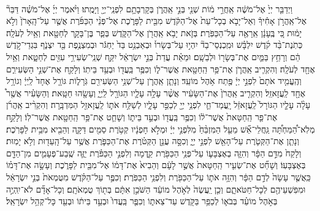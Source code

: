 \documentclass[twoside, openany, parskip=half, 11pt]{book}
\begin{document}
\begin{footnotesize}
\begin{multicols}{2}
\\
 וַיְדַבֵּ֤ר יְיָ֙ אֶל־מֹשֶׁ֔ה אַֽחֲרֵ֣י מ֔וֹת שְׁנֵ֖י בְּנֵ֣י אַֽהֲרֹ֑ן בְּקָרְבָתָ֥ם לִפְנֵֽי־יְיָ֖ וַיָּמֻֽתוּ׃ וַיֹּ֨אמֶר יְיָ֜ אֶל־מֹשֶׁ֗ה דַּבֵּר֘ אֶל־אַֽהֲרֹ֣ן אָחִ֒יךָ֒ וְאַל־יָבֹ֤א בְכָל־עֵת֙ אֶל־הַקֹּ֔דֶשׁ מִבֵּ֖ית לַפָּרֹ֑כֶת אֶל־פְּנֵ֨י הַכַּפֹּ֜רֶת אֲשֶׁ֤ר עַל־הָֽאָרֹן֙ וְלֹ֣א יָמ֔וּת כִּ֚י בֶּֽעָנָ֔ן אֵֽרָאֶ֖ה עַל־הַכַּפֹּֽרֶת׃ בְּזֹ֛את יָבֹ֥א אַֽהֲרֹ֖ן אֶל־הַקֹּ֑דֶשׁ בְּפַ֧ר בֶּן־בָּקָ֛ר לְחַטָּ֖את וְאַ֥יִל לְעֹלָֽה׃ כְּתֹֽנֶת־בַּ֨ד קֹ֜דֶשׁ יִלְבָּ֗שׁ וּמִֽכְנְסֵי־בַד֘ יִהְי֣וּ עַל־בְּשָׂרוֹ֒ וּבְאַבְנֵ֥ט בַּד֙ יַחְגֹּ֔ר וּבְמִצְנֶ֥פֶת בַּ֖ד יִצְנֹ֑ף בִּגְדֵי־קֹ֣דֶשׁ הֵ֔ם וְרָחַ֥ץ בַּמַּ֛יִם אֶת־בְּשָׂר֖וֹ וּלְבֵשָֽׁם׃ וּמֵאֵ֗ת עֲדַת֙ בְּנֵ֣י יִשְׂרָאֵ֔ל יִקַּ֛ח שְׁנֵֽי־שְׂעִירֵ֥י עִזִּ֖ים לְחַטָּ֑את וְאַ֥יִל אֶחָ֖ד לְעֹלָֽה׃ וְהִקְרִ֧יב אַֽהֲרֹ֛ן אֶת־פַּ֥ר הַֽחַטָּ֖את אֲשֶׁר־ל֑וֹ וְכִפֶּ֥ר בַּֽעֲד֖וֹ וּבְעַ֥ד בֵּיתֽוֹ׃  וְלָקַ֖ח אֶת־שְׁנֵ֣י הַשְּׂעִירִ֑ם וְהֶֽעֱמִ֤יד אֹתָם֙ לִפְנֵ֣י יְיָ֔ פֶּ֖תַח אֹ֥הֶל מוֹעֵֽד׃ וְנָתַ֧ן אַֽהֲרֹ֛ן עַל־שְׁנֵ֥י הַשְּׂעִירִ֖ם גֹּֽרָל֑וֹת גּוֹרָ֤ל אֶחָד֙ לַֽיְיָ֔ וְגוֹרָ֥ל אֶחָ֖ד לַֽעֲזָאזֵֽל׃ וְהִקְרִ֤יב אַֽהֲרֹן֙ אֶת־הַשָּׂעִ֔יר אֲשֶׁ֨ר עָלָ֥ה עָלָ֛יו הַגּוֹרָ֖ל לַֽיְיָ֑ וְעָשָׂ֖הוּ חַטָּֽאת׃ וְהַשָּׂעִ֗יר אֲשֶׁ֖ר֩ עָלָ֨ה עָלָ֤יו הַגּוֹרָל֙ לַֽעֲזָאזֵ֔ל יָֽעֳמַד־חַ֛י לִפְנֵ֥י יְיָ֖ לְכַפֵּ֣ר עָלָ֑יו לְשַׁלַּ֥ח אֹת֛וֹ לַֽעֲזָאזֵ֖ל הַמִּדְבָּֽרָה׃ וְהִקְרִ֨יב אַֽהֲרֹ֜ן אֶת־פַּ֤ר הַֽחַטָּאת֙ אֲשֶׁר־ל֔וֹ וְכִפֶּ֥ר בַּֽעֲד֖וֹ וּבְעַ֣ד בֵּית֑וֹ וְשָׁחַ֛ט אֶת־פַּ֥ר הַֽחַטָּ֖את אֲשֶׁר־לֽוֹ׃  וְלָקַ֣ח מְלֹֽא־הַ֠מַּחְתָּ֠ה גַּֽחֲלֵי־אֵ֞שׁ מֵעַ֤ל הַמִּזְבֵּ֨חַ֙ מִלִּפְנֵ֣י יְיָ֔ וּמְלֹ֣א חָפְנָ֔יו קְטֹ֥רֶת סַמִּ֖ים דַּקָּ֑ה וְהֵבִ֖יא מִבֵּ֥ית לַפָּרֹֽכֶת׃ וְנָתַ֧ן אֶת־הַקְּטֹ֛רֶת עַל־הָאֵ֖שׁ לִפְנֵ֣י יְיָ֑ וְכִסָּ֣ה עֲנַ֣ן הַקְּטֹ֗רֶת אֶת־הַכַּפֹּ֛רֶת אֲשֶׁ֥ר עַל־הָֽעֵד֖וּת וְלֹ֥א יָמֽוּת׃ וְלָקַח֙ מִדַּ֣ם הַפָּ֔ר וְהִזָּ֧ה בְאֶצְבָּע֛וֹ עַל־פְּנֵ֥י הַכַּפֹּ֖רֶת קֵ֑דְמָה וְלִפְנֵ֣י הַכַּפֹּ֗רֶת יַזֶּ֧ה שֶֽׁבַע־פְּעָמִ֛ים מִן־הַדָּ֖ם בְּאֶצְבָּעֽוֹ׃ וְשָׁחַ֞ט אֶת־שְׂעִ֤יר הַֽחַטָּאת֙ אֲשֶׁ֣ר לָעָ֔ם וְהֵבִיא֙ אֶת־דָּמ֔וֹ אֶל־מִבֵּ֖ית לַפָּרֹ֑כֶת וְעָשָׂ֣ה אֶת־דָּמ֗וֹ כַּֽאֲשֶׁ֤ר עָשָׂה֙ לְדַ֣ם הַפָּ֔ר וְהִזָּ֥ה אֹת֛וֹ עַל־הַכַּפֹּ֖רֶת וְלִפְנֵ֥י הַכַּפֹּֽרֶת׃ וְכִפֶּ֣ר עַל־הַקֹּ֗דֶשׁ מִטֻּמְאֹת֙ בְּנֵ֣י יִשְׂרָאֵ֔ל וּמִפִּשְׁעֵיהֶ֖ם לְכָל־חַטֹּאתָ֑ם וְכֵ֤ן יַֽעֲשֶׂה֙ לְאֹ֣הֶל מוֹעֵ֔ד הַשֹּׁכֵ֣ן אִתָּ֔ם בְּת֖וֹךְ טֻמְאֹתָֽם׃ וְכָל־אָדָ֞ם לֹא־יִֽהְיֶ֣ה בְּאֹ֣הֶל מוֹעֵ֗ד בְּבֹא֛וֹ לְכַפֵּ֥ר בַּקֹּ֖דֶשׁ עַד־צֵאת֑וֹ וְכִפֶּ֤ר בַּֽעֲדוֹ֙ וּבְעַ֣ד בֵּית֔וֹ וּבְעַ֖ד כָּל־קְהַ֥ל יִשְׂרָאֵֽל׃


\end{multicols}
\end{footnotesize}
\end{document}
